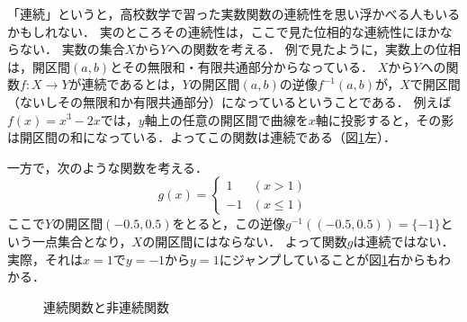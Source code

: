 \documentclass[11pt,a4paper]{jsarticle}
\begin{document}
\begin{develop}
「連続」というと，高校数学で習った実数関数の連続性を思い浮かべる人もいるかもしれない．
実のところその連続性は，ここで見た位相的な連続性にほかならない．
実数の集合$X$から$Y$への関数を考える．
例\label{ex:real}で見たように，実数上の位相は，開区間$(a,b)$とその無限和・有限共通部分からなっている．
$X$から$Y$への関数$f:X \to Y$が連続であるとは，$Y$の開区間$(a,b)$の逆像$f^{-1}(a,b)$が，$X$で開区間（ないしその無限和か有限共通部分）になっているということである．
例えば$f(x) = x^3-2x$では，$y$軸上の任意の開区間で曲線を$x$軸に投影すると，その影は開区間の和になっている．よってこの関数は連続である（図\ref{fig:realcontinuous}左）．

一方で，次のような関数を考える．
\[
g(x) = \left\{
\begin{array}{ll}
1 & (x > 1)\\
-1 & (x \leq 1)
\end{array}
\right. 
\]
ここで$Y$の開区間$(-0.5, 0.5)$をとると，この逆像$g^{-1}((-0.5, 0.5)) = \{ -1 \}$という一点集合となり，$X$の開区間にはならない．
よって関数$g$は連続ではない．実際，それは$x=1$で$y=-1$から$y=1$にジャンプしていることが図\ref{fig:realcontinuous}右からもわかる．

\begin{figure}[h]
  \begin{minipage}[b]{0.45\linewidth}
    \centering
  \end{minipage}
  \begin{minipage}[b]{0.45\linewidth}
  \end{minipage}
 \caption{連続関数と非連続関数}
 \label{fig:realcontinuous}
\end{figure}
\end{develop}
\end{document}
